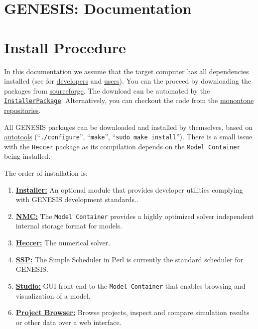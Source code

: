 \documentclass[12pt]{article}
\begin{document}
\section*{GENESIS: Documentation}

\section*{Install Procedure}
In this documentation we assume that the target computer has all dependencies installed (see for \href{../installation-developer/installation-developer.tex}{developers} and \href{../installation-user/installation-user.tex}{users}). You can the proceed by downloading the packages from \href{http://sourceforge.net/project/showfiles.php?group_id=162899}{sourceforge}. The download can be automated by the \href{../installer-package/installer-package.tex}{\tt InstallerPackage}. Alternatively, you can checkout the code from the \href{http://monotone.ca/}{monontone} \href{../developers-intro/developers-intro.tex}{repositories}.

All GENESIS packages can be downloaded and installed by themselves, based on \href{http://www.gnu.org/software/autoconf/}{autotools} (``{\tt ./configure}'', ``{\tt make}'', ``{\tt sudo make install}''). There is a small issue with the {\tt Heccer} package as its compilation depends on the {\tt Model Container} being installed.

The order of installation is:
\begin{enumerate}
\item \href{../installer-package/installer-package.tex}{\bf Installer:} An optional module that provides developer utilities complying with GENESIS development standards..
\item \href{../model-container/model-container.tex}{\bf NMC:} The {\tt Model Container} provides a highly optimized solver independent internal storage format for models.
\item \href{../heccer/heccer.tex}{\bf Heccer:} The numerical solver.
\item \href{../ssp/ssp.tex}{\bf SSP:} The Simple Scheduler in Perl is currently the standard scheduler for GENESIS.
\item \href{../studio/studio.tex}{\bf Studio:} GUI front-end to the {\tt Model Container} that enables browsing and visualization of a model.
\item \href{../project-browser/project-browser}{\bf Project Browser:} Browse projects, inspect and compare simulation results or other data over a web interface. 
\end{enumerate} 
\end{document}
